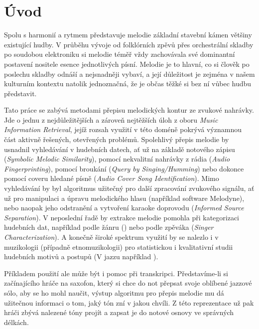 \chapter*{Úvod}

Spolu s harmonií a rytmem představuje melodie základní stavební kámen většiny existující hudby. V průběhu vývoje od folklórních zpěvů přes orchestrální skladby po soudobou elektroniku si melodie téměř vždy zachovávala své dominantní postavení nositele esence jednotlivých písní. Melodie je to hlavní, co si člověk po poslechu skladby odnáší a nejsnadněji vybaví, a její důležitost je zejména v našem kulturním kontextu natolik jednoznačná, že je občas těžké si bez ní vůbec hudbu představit. 

Tato práce se zabývá metodami přepisu melodických kontur ze zvukové nahrávky. Jde o jednu z nejdůležitějších a zároveň nejtěžších úloh z oboru \textit{Music Information Retrieval}, jejíž rozsah využití v této doméně pokrývá významnou část aktivně řešených, otevřených problémů. Spolehlivý přepis melodie by usnadnil vyhledávání v hudebních datech, ať už na základě notového zápisu (\textit{Symbolic Melodic Similarity}), pomocí nekvalitní nahrávky z rádia (\textit{Audio Fingerprinting}), pomocí broukání (\textit{Query by Singing/Humming}) nebo dokonce pomocí coveru hledané písně (\textit{Audio Cover Song Identification}). Mimo vyhledávání by byl algoritmus užitečný pro další zpracování zvukového signálu, ať už pro manipulaci a úpravu melodického hlasu (například software Melodyne), nebo naopak jeho odstranění a vytvoření karaoke doprovodu (\textit{Informed Source Separation}). V neposlední řadě by extrakce melodie pomohla při kategorizaci hudebních dat, například podle žánru (\cite{Salamon2012}) nebo podle zpěváka (\textit{Singer Characterization}). A konečně široké spektrum využití by se nalezlo i v muzikologii (případně etnomuzikologii) pro statistickou i kvalitativní studii hudebních motivů a postupů (V jazzu například \cite{Pfleiderer}).

Příkladem použití ale může být i pomoc při transkripci. Představíme-li si začínajícího hráče na saxofon, který si chce do not přepsat svoje oblíbené jazzové sólo, aby se ho mohl naučit, výstup algoritmu pro přepis melodie mu dá užitečnou informaci o tom, jaký tón zní v jakou chvíli. Z této reprezentace už pak hráči zbývá nalezené tóny projít a zapsat je do notové osnovy ve správných délkách.